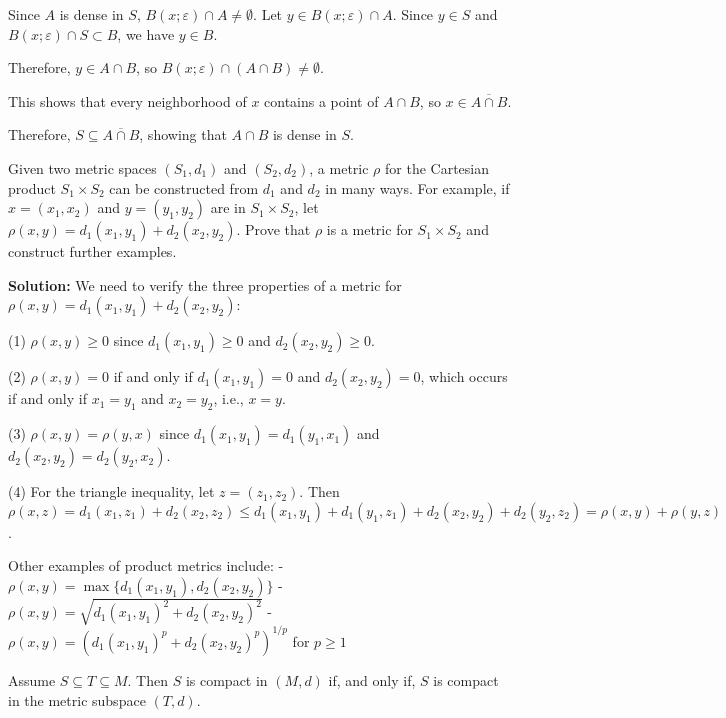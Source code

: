Since $A$ is dense in $S$, $B(x;\varepsilon) \cap A \neq \emptyset$. Let $y \in B(x;\varepsilon) \cap A$. Since $y \in S$ and $B(x;\varepsilon) \cap S \subset B$, we have $y \in B$.

Therefore, $y \in A \cap B$, so $B(x;\varepsilon) \cap (A \cap B) \neq \emptyset$.

This shows that every neighborhood of $x$ contains a point of $A \cap B$, so $x \in \overline{A \cap B}$.

Therefore, $S \subseteq \overline{A \cap B}$, showing that $A \cap B$ is dense in $S$.

\begin{problembox}
Given two metric spaces \((S_1, d_1)\) and \((S_2, d_2)\), a metric \( \rho \) for the Cartesian product \( S_1 \times S_2 \) can be constructed from \( d_1 \) and \( d_2 \) in many ways. For example, if \( x = (x_1, x_2) \) and \( y = (y_1, y_2) \) are in \( S_1 \times S_2 \), let \( \rho(x, y) = d_1(x_1, y_1) + d_2(x_2, y_2) \). Prove that \( \rho \) is a metric for \( S_1 \times S_2 \) and construct further examples.
\end{problembox}

\textbf{Solution:} We need to verify the three properties of a metric for $\rho(x,y) = d_1(x_1,y_1) + d_2(x_2,y_2)$:

(1) $\rho(x,y) \geq 0$ since $d_1(x_1,y_1) \geq 0$ and $d_2(x_2,y_2) \geq 0$.

(2) $\rho(x,y) = 0$ if and only if $d_1(x_1,y_1) = 0$ and $d_2(x_2,y_2) = 0$, which occurs if and only if $x_1 = y_1$ and $x_2 = y_2$, i.e., $x = y$.

(3) $\rho(x,y) = \rho(y,x)$ since $d_1(x_1,y_1) = d_1(y_1,x_1)$ and $d_2(x_2,y_2) = d_2(y_2,x_2)$.

(4) For the triangle inequality, let $z = (z_1,z_2)$. Then $\rho(x,z) = d_1(x_1,z_1) + d_2(x_2,z_2) \leq d_1(x_1,y_1) + d_1(y_1,z_1) + d_2(x_2,y_2) + d_2(y_2,z_2) = \rho(x,y) + \rho(y,z)$.

Other examples of product metrics include:
- $\rho(x,y) = \max\{d_1(x_1,y_1), d_2(x_2,y_2)\}$
- $\rho(x,y) = \sqrt{d_1(x_1,y_1)^2 + d_2(x_2,y_2)^2}$
- $\rho(x,y) = (d_1(x_1,y_1)^p + d_2(x_2,y_2)^p)^{1/p}$ for $p \geq 1$

\begin{problembox}
Assume \( S \subseteq T \subseteq M \). Then \( S \) is compact in \((M, d)\) if, and only if, \( S \) is compact in the metric subspace \((T, d)\).
\end{problembox}

